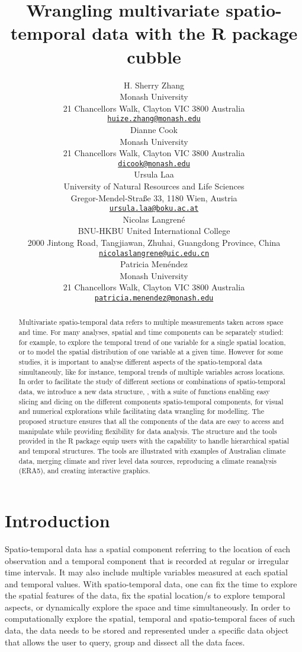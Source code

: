 \documentclass{article}
\title{Wrangling multivariate spatio-temporal data with the R package cubble}
\author{
    H. Sherry Zhang
   \\
    Monash University \\
  21 Chancellors Walk, Clayton VIC 3800 Australia \\
  \texttt{\href{mailto:huize.zhang@monash.edu}{\nolinkurl{huize.zhang@monash.edu}}} \\
   \And
    Dianne Cook
   \\
    Monash University \\
  21 Chancellors Walk, Clayton VIC 3800 Australia \\
  \texttt{\href{mailto:dicook@monash.edu}{\nolinkurl{dicook@monash.edu}}} \\
   \And
    Ursula Laa
   \\
    University of Natural Resources and Life Sciences \\
  Gregor-Mendel-Straße 33, 1180 Wien, Austria \\
  \texttt{\href{mailto:ursula.laa@boku.ac.at}{\nolinkurl{ursula.laa@boku.ac.at}}} \\
   \And
    Nicolas Langrené
   \\
    BNU-HKBU United International College \\
  2000 Jintong Road, Tangjiawan, Zhuhai, Guangdong Province, China \\
  \texttt{\href{mailto:nicolaslangrene@uic.edu.cn}{\nolinkurl{nicolaslangrene@uic.edu.cn}}} \\
   \And
    Patricia Menéndez
   \\
    Monash University \\
  21 Chancellors Walk, Clayton VIC 3800 Australia \\
  \texttt{\href{mailto:patricia.menendez@monash.edu}{\nolinkurl{patricia.menendez@monash.edu}}} \\
  }
\begin{document}
\maketitle


\begin{abstract}
Multivariate spatio-temporal data refers to multiple measurements taken across space and time. For many analyses, spatial and time components can be separately studied: for example, to explore the temporal trend of one variable for a single spatial location, or to model the spatial distribution of one variable at a given time. However for some studies, it is important to analyse different aspects of the spatio-temporal data simultaneouly, like for instance, temporal trends of multiple variables across locations. In order to facilitate the study of different sections or combinations of spatio-temporal data, we introduce a new data structure, , with a suite of functions enabling easy slicing and dicing on the different components spatio-temporal components, for visual and numerical explorations while facilitating data wrangling for modelling. The proposed  structure ensures that all the components of the data are easy to access and manipulate while providing flexibility for data analysis. The  structure and the tools provided in the  R package equip users with the capability to handle hierarchical spatial and temporal structures. The tools are illustrated with examples of Australian climate data, merging climate and river level data sources, reproducing a climate reanalysis (ERA5), and creating interactive graphics.
\end{abstract}


\newpage

\hypertarget{introduction}{%
\section{Introduction}\label{introduction}}

Spatio-temporal data has a spatial component referring to the location of each observation and a temporal component that is recorded at regular or irregular time intervals. It may also include multiple variables measured at each spatial and temporal values. With spatio-temporal data, one can fix the time to explore the spatial features of the data, fix the spatial location/s to explore temporal aspects, or dynamically explore the space and time simultaneously.
In order to computationally explore the spatial, temporal and spatio-temporal faces of such data, the data needs to be stored and represented under a specific data object that allows the user to query, group and dissect all the data faces.
\end{document}
